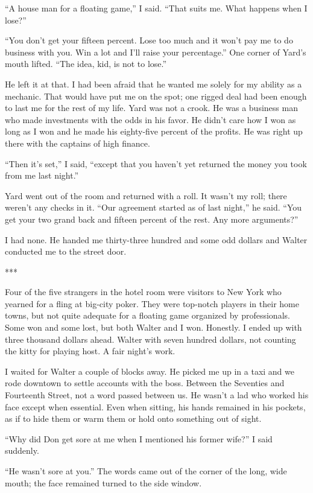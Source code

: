 \documentclass{novel}
\begin{document}
“A house man for a floating game,” I said. “That suits me. What happens when I lose?”

“You don’t get your fifteen percent. Lose too much and it won’t pay me to do business with you. Win a lot and I’ll raise your percentage.” One corner of Yard’s mouth lifted. “The idea, kid, is not to lose.”

He left it at that. I had been afraid that he wanted me solely for my ability as a mechanic. That would have put me on the spot; one rigged deal had been enough to last me for the rest of my life. Yard was not a crook. He was a business man who made investments with the odds in his favor. He didn’t care how I won as long as I won and he made his eighty-five percent of the profits. He was right up there with the captains of high finance.

“Then it’s set,” I said, “except that you haven’t yet returned the money you took from me last night.”

Yard went out of the room and returned with a roll. It wasn’t my roll; there weren’t any checks in it. “Our agreement started as of last night,” he said. “You get your two grand back and fifteen percent of the rest. Any more arguments?”

I had none. He handed me thirty-three hundred and some odd dollars and Walter conducted me to the street door.

***

Four of the five strangers in the hotel room were visitors to New York who yearned for a fling at big-city poker. They were top-notch players in their home towns, but not quite adequate for a floating game organized by professionals. Some won and some lost, but both Walter and I won. Honestly. I ended up with three thousand dollars ahead. Walter with seven hundred dollars, not counting the kitty for playing host. A fair night’s work.

I waited for Walter a couple of blocks away. He picked me up in a taxi and we rode downtown to settle accounts with the boss. Between the Seventies and Fourteenth Street, not a word passed between us. He wasn’t a lad who worked his face except when essential. Even when sitting, his hands remained in his pockets, as if to hide them or warm them or hold onto something out of sight.

“Why did Don get sore at me when I mentioned his former wife?” I said suddenly.

“He wasn’t sore at you.” The words came out of the corner of the long, wide mouth; the face remained turned to the side window.
\end{document}
